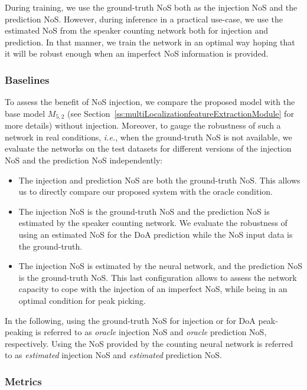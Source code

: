 During training, we use the ground-truth NoS both as the injection NoS and the prediction NoS. However, during inference in a practical use-case, we use the estimated NoS from the speaker counting network both for injection and prediction. In that manner, we train the network in an optimal way hoping that it will be robust enough when an imperfect NoS information is provided.

\subsubsection{Baselines}

To assess the benefit of NoS injection, we compare the proposed model with the base model $M_{5,2}$ (see Section~\ref{ss:multiLocalizationfeatureExtractionModule} for more details) without injection. Moreover, to gauge the robustness of such a network in real conditions, \emph{i.e.}, when the ground-truth NoS is not available, we evaluate the networks on the test datasets for different versions of the injection NoS and the prediction NoS independently:
\begin{itemize}
    \item The injection and prediction NoS are both the ground-truth NoS. This allows us to directly compare our proposed system with the oracle condition.
    \item The injection NoS is the ground-truth NoS and the prediction NoS is estimated by the speaker counting network. We evaluate the robustness of using an estimated NoS for the DoA prediction while the NoS input data is the ground-truth.
    \item The injection NoS is estimated by the neural network, and the prediction NoS is the ground-truth NoS. This last configuration allows to assess the network capacity to cope with the injection of an imperfect NoS, while being in an optimal condition for peak picking. 
\end{itemize}

In the following, using the ground-truth NoS for injection or for DoA peak-peaking is referred to as \textit{oracle} injection NoS and \textit{oracle} prediction NoS, respectively. Using the NoS provided by the counting neural network is referred to as \textit{estimated} injection NoS and \textit{estimated} prediction NoS.

\subsubsection{Metrics}

